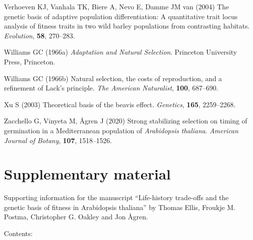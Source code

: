 \documentclass[]{article}
\begin{document}
\leavevmode\hypertarget{ref-Verhoeven2004}{}%
Verhoeven KJ, Vanhala TK, Biere A, Nevo E, Damme JM van (2004) The genetic basis of adaptive population differentiation: A quantitative trait locus analysis of fitness traits in two wild barley populations from contrasting habitats. \emph{Evolution}, \textbf{58}, 270--283.

\leavevmode\hypertarget{ref-Williams1966}{}%
Williams GC (1966a) \emph{Adaptation and Natural Selection}. Princeton University Press, Princeton.

\leavevmode\hypertarget{ref-Williams1966a}{}%
Williams GC (1966b) Natural selection, the costs of reproduction, and a refinement of Lack's principle. \emph{The American Naturalist}, \textbf{100}, 687--690.

\leavevmode\hypertarget{ref-xu2003theoretical}{}%
Xu S (2003) Theoretical basis of the beavis effect. \emph{Genetics}, \textbf{165}, 2259--2268.

\leavevmode\hypertarget{ref-zacchello2020strong}{}%
Zacchello G, Vinyeta M, Ågren J (2020) Strong stabilizing selection on timing of germination in a Mediterranean population of \emph{Arabidopsis thaliana}. \emph{American Journal of Botany}, \textbf{107}, 1518--1526.

\newpage

\hypertarget{supplementary-material}{%
\section*{Supplementary material}\label{supplementary-material}}

\setcounter{table}{0}  \renewcommand{\thetable}{S\arabic{table}} \setcounter{figure}{0} \renewcommand{\thefigure}{S\arabic{figure}}

Supporting information for the manuscript ``Life-history trade-offs and the genetic basis of fitness in Arabidopsis thaliana'' by Thomas Ellis, Froukje M. Postma, Christopher G. Oakley and Jon Ågren.

Contents:
\end{document}
